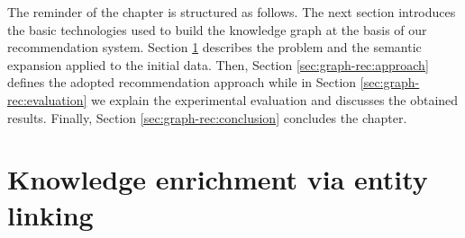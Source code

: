 
%

The reminder of the chapter is structured as follows. The next section introduces the basic technologies used to build the knowledge graph at the basis of our recommendation system. Section \ref{sec:graph-rec:enrichment} describes the problem and the semantic expansion applied to the initial data. Then, Section \ref{sec:graph-rec:approach} defines the adopted recommendation approach while in Section \ref{sec:graph-rec:evaluation} we explain the experimental evaluation and discusses the obtained results. Finally, Section \ref{sec:graph-rec:conclusion} concludes the chapter.


\section{Knowledge enrichment via entity linking}
\label{sec:graph-rec:enrichment}
 
